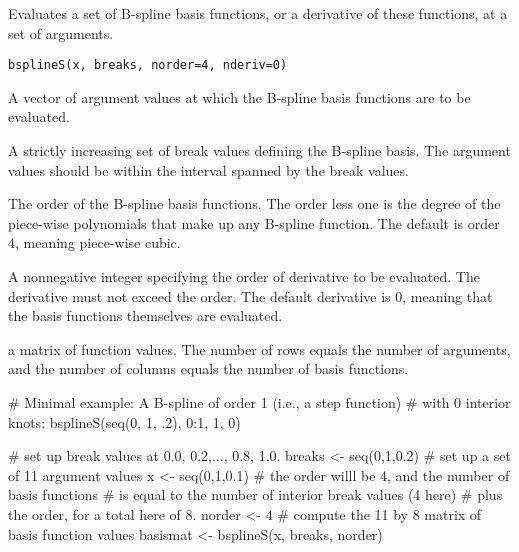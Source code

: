 \begin{Description}\relax
Evaluates a set of B-spline basis functions, or a derivative of these
functions, at a set of arguments.
\end{Description}
\begin{Usage}
\begin{verbatim}
bsplineS(x, breaks, norder=4, nderiv=0)
\end{verbatim}
\end{Usage}
\begin{Arguments}
\begin{ldescription}
\item[\code{x}] A vector of argument values at which the B-spline basis functions
are to be evaluated.

\item[\code{breaks}] A strictly increasing set of break values defining the B-spline
basis.  The argument values  should be within the interval
spanned by the break values.

\item[\code{norder}] The order of the B-spline basis functions.  The order less one is
the degree of the piece-wise polynomials that make up any B-spline
function. The default is order 4, meaning piece-wise cubic.

\item[\code{nderiv}] A nonnegative integer specifying the order of derivative to be
evaluated.  The derivative must not exceed the order.  The default 
derivative is 0, meaning that the basis functions themselves are
evaluated. 

\end{ldescription}
\end{Arguments}
\begin{Value}
a matrix of function values.  The number of rows equals the number of 
arguments, and the number of columns equals the number of basis
functions.
\end{Value}
\begin{Examples}
\begin{ExampleCode}
# Minimal example:  A B-spline of order 1 (i.e., a step function)
# with 0 interior knots:
bsplineS(seq(0, 1, .2), 0:1, 1, 0)

#  set up break values at 0.0, 0.2,..., 0.8, 1.0.
breaks <- seq(0,1,0.2)
#  set up a set of 11 argument values
x <- seq(0,1,0.1)
#  the order willl be 4, and the number of basis functions
#  is equal to the number of interior break values (4 here)
#  plus the order, for a total here of 8.
norder <- 4
#  compute the 11 by 8 matrix of basis function values
basismat <- bsplineS(x, breaks, norder)
\end{ExampleCode}
\end{Examples}


